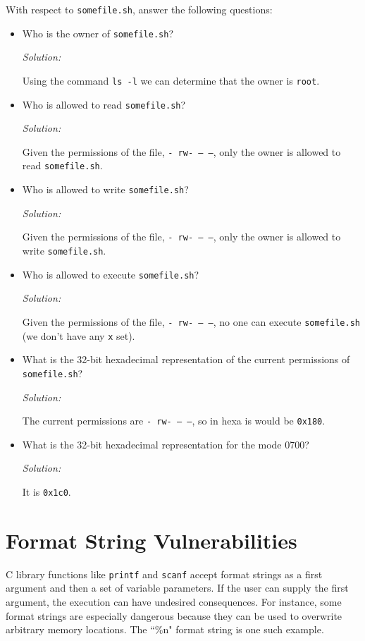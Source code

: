 \documentclass[a4paper,11pt]{article}
\newenvironment{solution}%
{\par{\noindent\small\textit{Solution:}}\vspace{-12pt}\begin{framed}}%
{\end{framed}\par}
\begin{document}
\noindent With respect to \texttt{somefile.sh}, answer the following questions:
\begin{itemize}
\item Who is the owner of \texttt{somefile.sh}?
\ifsolution\begin{solution}
Using the command \texttt{ls -l} we can determine that the owner is \texttt{root}.
\end{solution}\fi

\item Who is allowed to read \texttt{somefile.sh}?
\ifsolution\begin{solution}
Given the permissions of the file, \texttt{- rw- --- ---}, only the owner is allowed to read \texttt{somefile.sh}.
\end{solution}\fi
\item Who is allowed to write \texttt{somefile.sh}?
\ifsolution\begin{solution}
Given the permissions of the file, \texttt{- rw- --- ---}, only the owner is allowed to write \texttt{somefile.sh}.
\end{solution}\fi
\item Who is allowed to execute \texttt{somefile.sh}?
\ifsolution\begin{solution}
Given the permissions of the file, \texttt{- rw- --- ---}, no one can execute \texttt{somefile.sh} (we don't have
any \texttt{x} set).
\end{solution}\fi
\item What is the 32-bit hexadecimal representation of the current permissions
  of \texttt{somefile.sh}?
\ifsolution\begin{solution}
The current permissions are \texttt{- rw- --- ---}, so in hexa is would be \texttt{0x180}.
\end{solution}\fi
\item What is the 32-bit hexadecimal representation for the mode 0700? 
\ifsolution\begin{solution}
It is \texttt{0x1c0}.
\end{solution}\fi
\end{itemize}

\section*{Format String Vulnerabilities}

C library functions like \texttt{printf} and \texttt{scanf} accept format
strings as a first argument and then a set of variable parameters. If the user
can supply the first argument, the execution can have undesired consequences.
For instance, some format strings are especially dangerous because they can be
used to overwrite arbitrary memory locations. The ``\%n" format string is one
such example. 
\end{document}
